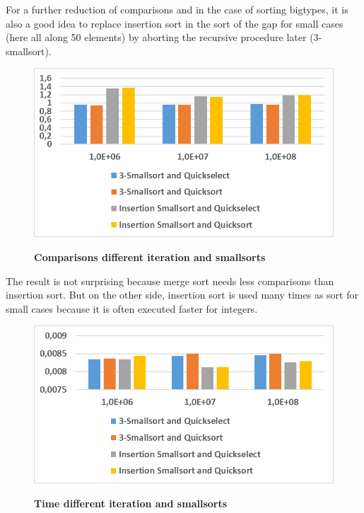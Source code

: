\documentclass[11pt,pdftex,a4paper, twocolumn]{article}
\begin{document}
For a further reduction of comparisons and in the case of sorting bigtypes, it is also a good idea to replace insertion sort in the sort of the gap for small cases (here all along 50 elements) by aborting the recursive procedure later (3-smallsort). \\
\begin{figure}[H]
\includegraphics[width=\linewidth]{Diagramm-Bilder/comparisons-diff-iter-and-smallsorts.JPG} \\
\caption{\textbf{Comparisons different iteration and smallsorts}} \label{fig:comparisons-diff-iter-and-smallsorts}
\end{figure}
The result is not surprising because merge sort needs less comparisons than insertion sort. But on the other side, insertion sort is used many times as sort for small cases because it is often executed faster for integers. \\
\begin{figure}[H]
\includegraphics[width=\linewidth]{Diagramm-Bilder/time-diff-iter-and-smallsorts.JPG} \\
\caption{\textbf{Time different iteration and smallsorts}} \label{fig:time-diff-iter-and-smallsorts}
\end{figure}
\end{document}
